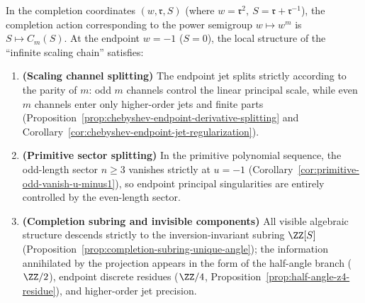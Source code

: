 \begin{proposition}\label{prop:endpoint-decomposition-paradigm}
In the completion coordinates \((w,\mathfrak{r},S)\) (where \(w=\mathfrak{r}^2,\ S=\mathfrak{r}+\mathfrak{r}^{-1}\)), the completion action corresponding to the power semigroup \(w\mapsto w^m\) is \(S\mapsto C_m(S)\).
At the endpoint \(w=-1\) (\(S=0\)), the local structure of the ``infinite scaling chain'' satisfies:
\begin{enumerate}
  \item \textbf{(Scaling channel splitting)} The endpoint jet splits strictly according to the parity of \(m\): odd \(m\) channels control the linear principal scale, while even \(m\) channels enter only higher-order jets and finite parts (Proposition~\ref{prop:chebyshev-endpoint-derivative-splitting} and Corollary~\ref{cor:chebyshev-endpoint-jet-regularization}).
  \item \textbf{(Primitive sector splitting)} In the primitive polynomial sequence, the odd-length sector \(n\ge 3\) vanishes strictly at \(u=-1\) (Corollary~\ref{cor:primitive-odd-vanish-u-minus1}), so endpoint principal singularities are entirely controlled by the even-length sector.
  \item \textbf{(Completion subring and invisible components)} All visible algebraic structure descends strictly to the inversion-invariant subring \(\ZZ[S]\) (Proposition~\ref{prop:completion-subring-unique-angle}); the information annihilated by the projection appears in the form of the half-angle branch (\(\ZZ/2\)), endpoint discrete residues (\(\ZZ/4\), Proposition~\ref{prop:half-angle-z4-residue}), and higher-order jet precision.
\end{enumerate}
\end{proposition}

